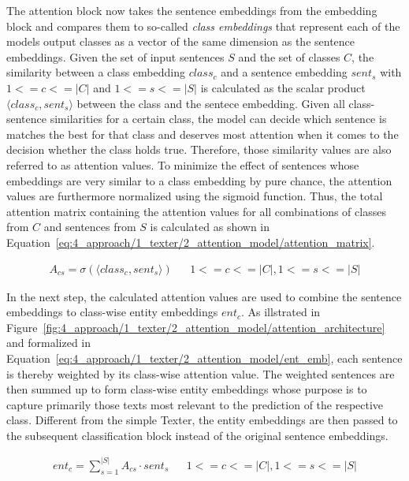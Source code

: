 The attention block now takes the sentence embeddings from the embedding block and compares them to so-called \emph{class embeddings} that represent each of the models output classes as a vector of the same dimension as the sentence embeddings. Given the set of input sentences $S$ and the set of classes $C$, the similarity between a class embedding $class_c$ and a sentence embedding $sent_s$ with $1 <= c <= |C|$ and $1 <= s <= |S|$ is calculated as the scalar product $\langle class_c, sent_s \rangle$ between the class and the sentece embedding. Given all class-sentence similarities for a certain class, the model can decide which sentence is matches the best for that class and deserves most attention when it comes to the decision whether the class holds true. Therefore, those similarity values are also referred to as attention values. To minimize the effect of sentences whose embeddings are very similar to a class embedding by pure chance, the attention values are furthermore normalized using the sigmoid function. Thus, the total attention matrix containing the attention values for all combinations of classes from $C$ and sentences from $S$ is calculated as shown in Equation~\ref{eq:4_approach/1_texter/2_attention_model/attention_matrix}.

\begin{align}
    A_{cs} = \sigma(\langle class_c , sent_s \rangle) && 1 <= c <= |C|, 1 <= s <= |S|
    \label{eq:4_approach/1_texter/2_attention_model/attention_matrix}
\end{align}

In the next step, the calculated attention values are used to combine the sentence embeddings to class-wise entity embeddings $ent_c$. As illstrated in Figure~\ref{fig:4_approach/1_texter/2_attention_model/attention_architecture} and formalized in Equation~\ref{eq:4_approach/1_texter/2_attention_model/ent_emb}, each sentence is thereby weighted by its class-wise attention value. The weighted sentences are then summed up to form class-wise entity embeddings whose purpose is to capture primarily those texts most relevant to the prediction of the respective class. Different from the simple Texter, the entity embeddings are then passed to the subsequent classification block instead of the original sentence embeddings.

\begin{align}
    ent_c = \sum_{s = 1}^{|S|} A_{cs} \cdot sent_s && 1 <= c <= |C|, 1 <= s <= |S|
    \label{eq:4_approach/1_texter/2_attention_model/ent_emb}
\end{align}


